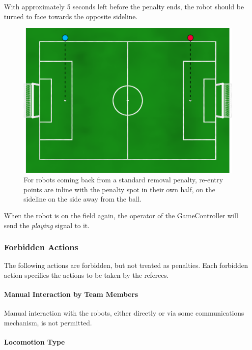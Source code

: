 With approximately 5 seconds left before the penalty ends, the robot should be turned to face towards the opposite sideline.

\begin{figure}[t]
	\centerline{\includegraphics[width=\columnwidth]{figs/penalty_re-entry_points_2020.png}}
	\caption{For robots coming back from a standard removal penalty, re-entry points are inline with the penalty spot in their own half, on the sideline on the side away from the ball.}
	\label{fig:penalty_re-entry_points}
\end{figure}

When the robot is on the field again, the operator of the GameController will send the \emph{playing} signal to it.

\subsubsection{Forbidden Actions}

The following actions are forbidden, but not treated as penalties.
Each forbidden action specifies the actions to be taken by the referees.

\paragraph{Manual Interaction by Team Members}

Manual interaction with the robots, either directly or via some communications mechanism, is not permitted.

\paragraph{Locomotion Type}
\label{sec:locomotion_type}

